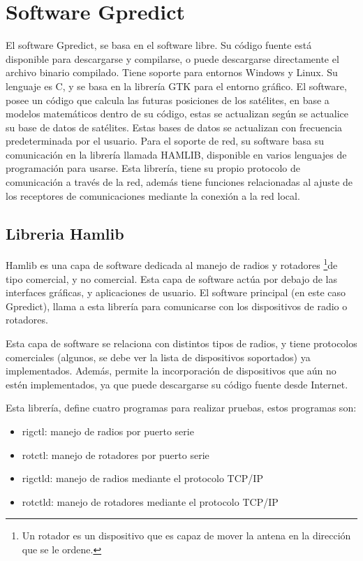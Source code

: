\section{Software Gpredict} 
El software Gpredict, se basa en el software libre. Su código fuente está disponible para descargarse y compilarse, o puede descargarse directamente el archivo binario compilado. Tiene soporte para entornos Windows y Linux. Su lenguaje es C, y se basa en la librería GTK para el entorno gráfico. El software, posee un código que calcula las futuras posiciones de los satélites, en base a modelos matemáticos dentro de su código, estas se actualizan según se actualice su base de datos de satélites. Estas bases de datos se actualizan con frecuencia predeterminada por el usuario.  
Para el soporte de red, su software basa su comunicación en la librería llamada HAMLIB, disponible en varios lenguajes de programación para usarse. Esta librería, tiene su propio protocolo de comunicación a través de la red, además tiene funciones relacionadas al ajuste de los receptores de comunicaciones mediante la conexión a la red local.   

\subsection{Libreria Hamlib}
Hamlib es una capa de software dedicada al manejo de radios y rotadores \footnote{Un rotador es un dispositivo que es capaz de mover la antena en la dirección que se le ordene.}de tipo comercial, y no comercial. Esta capa de software actúa por debajo de las interfaces gráficas, y aplicaciones de usuario. El software principal (en este caso Gpredict), llama a esta librería para comunicarse con los dispositivos de radio o rotadores. 

Esta capa de software se relaciona con distintos tipos de radios, y tiene protocolos comerciales (algunos, se debe ver la lista de dispositivos soportados) ya implementados. Además, permite la incorporación de dispositivos que aún no estén implementados, ya que puede descargarse su código fuente desde Internet. 

Esta librería, define cuatro programas para realizar pruebas, estos programas son: 
\begin{itemize}
	\item rigctl: manejo de radios por puerto serie 
	\item rotctl: manejo de rotadores por puerto serie
	\item rigctld: manejo de radios mediante el protocolo TCP/IP
	\item rotctld: manejo de rotadores mediante el protocolo TCP/IP
\end{itemize}


